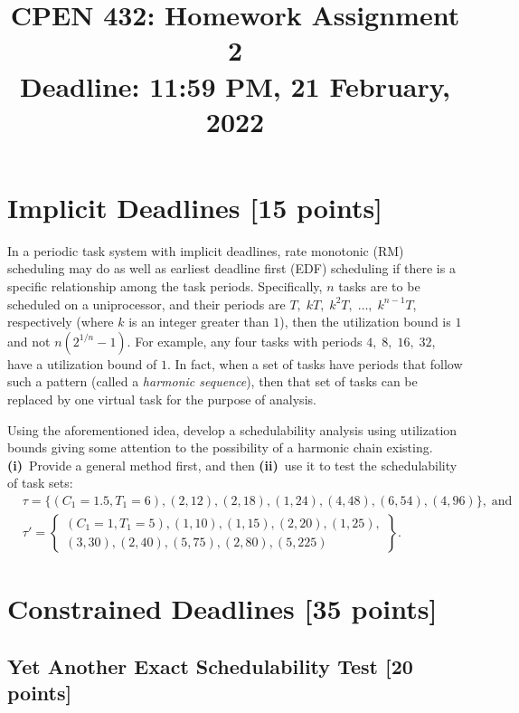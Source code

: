 \documentclass[12pt]{article}
\title{
  CPEN 432: Homework Assignment 2 \\
  \large
  Deadline: 11:59 PM, 21 February, 2022
}
\date{}
\begin{document}
\maketitle

\setlength{\baselineskip}{0.90\baselineskip}

\pagestyle{empty}

\section{Implicit Deadlines [15 points]}

In a periodic task system with implicit deadlines, rate monotonic (RM)
scheduling may do as well as earliest deadline first (EDF) scheduling if there
is a specific relationship among the task periods.
Specifically, $n$ tasks are to be scheduled on a uniprocessor, and their periods
are $T,\; kT,\; k^{2}T,\; \dots,\; k^{n-1}T$, respectively (where $k$ is an
integer greater than $1$), then the utilization bound is $1$ and not
$n(2^{1/n}-1)$. For example, any four tasks with periods $4,\; 8,\; 16,\; 32$,
have a utilization bound of $1$. In fact, when a set of tasks have periods that
follow such a pattern (called a {\em harmonic sequence}), then that set of tasks
can be replaced by one virtual task for the purpose of analysis.

Using the aforementioned idea, develop a schedulability analysis using
utilization bounds giving some attention to the possibility of a harmonic chain
existing. \textbf{(i)}~Provide a general method first, and then
\textbf{(ii)}~use it to test the schedulability of task sets:
\begin{align}
&\tau = \{(C_{1}=1.5,T_{1}=6),(2,12),(2,18),(1,24),(4,48),(6,54),(4,96)\}, \; \nonumber \text{and} \\
&\tau' = \left\{\substack{(C_{1}=1,T_{1}=5),(1,10),(1,15),(2,20),(1,25),\\(3,30),(2,40),(5,75),(2,80),(5,225)}\right\}. \nonumber
\end{align}

\section{Constrained Deadlines [35 points]}

\subsection{Yet Another Exact Schedulability Test [20 points]}
\end{document}

